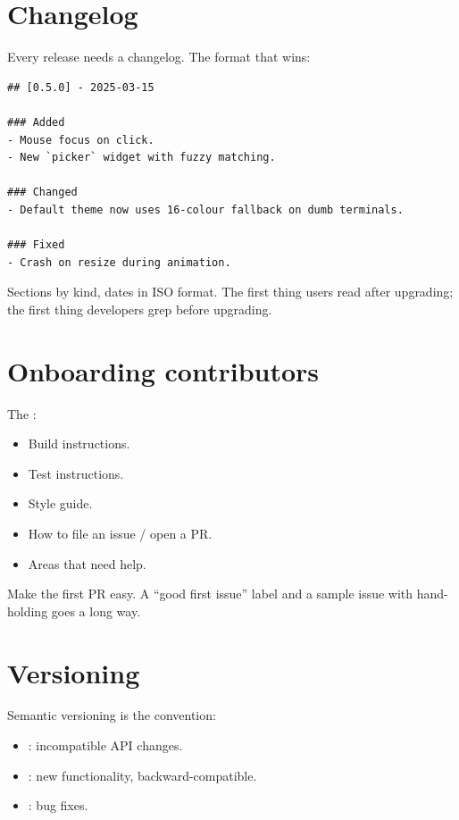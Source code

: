\section{Changelog}

Every release needs a changelog. The format that wins:

\begin{lstlisting}
## [0.5.0] - 2025-03-15

### Added
- Mouse focus on click.
- New `picker` widget with fuzzy matching.

### Changed
- Default theme now uses 16-colour fallback on dumb terminals.

### Fixed
- Crash on resize during animation.
\end{lstlisting}

Sections by kind, dates in ISO format. The first thing users
read after upgrading; the first thing developers grep before
upgrading.

\section{Onboarding contributors}

The :

\begin{itemize}[leftmargin=*]
  \item Build instructions.
  \item Test instructions.
  \item Style guide.
  \item How to file an issue / open a PR.
  \item Areas that need help.
\end{itemize}

Make the first PR easy. A ``good first issue'' label and a
sample issue with hand-holding goes a long way.

\section{Versioning}

Semantic versioning is the convention:

\begin{itemize}[leftmargin=*]
  \item {}: incompatible API changes.
  \item {}: new functionality, backward-compatible.
  \item {}: bug fixes.
\end{itemize}

